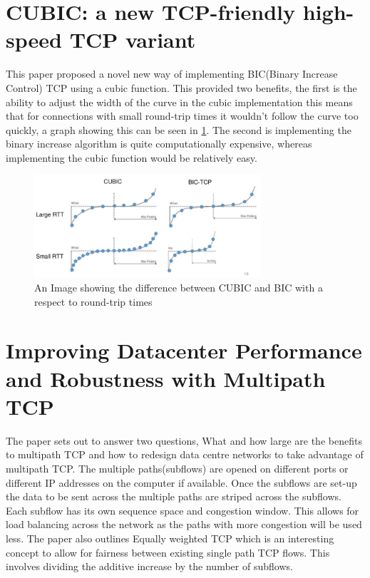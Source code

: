 \documentclass[a4paper,12pt]{scrartcl}
\begin{document}
	\section{CUBIC: a new TCP-friendly high-speed TCP variant\cite{HaRheeXuCubic}}
	{
		This paper proposed a novel new way of implementing BIC(Binary Increase Control) TCP using a cubic function. This provided two benefits, the first is the ability to adjust the width of the curve in the cubic implementation this means that for connections with small round-trip times it wouldn't follow the curve too quickly, a graph showing this can be seen in \cref{fig:BICVsCubicRTT}. The second is implementing the binary increase algorithm is quite computationally expensive, whereas implementing the cubic function would be relatively easy.
		\begin{figure}[h]
			\centering
			\includegraphics[width=0.75\textwidth]{BICVsCubicRTT}
			\caption{An Image showing the difference between CUBIC and BIC with a respect to round-trip times\cite{deawookim2015}}
			\label{fig:BICVsCubicRTT}
		\end{figure}
	}
	\section{Improving Datacenter Performance and Robustness with Multipath TCP\cite{RaiciuBarrePluntkeGreenhalghWischikHandleyMultipathTCPArticle}}
	{
		The paper sets out to answer two questions, What and how large are the benefits to multipath TCP and how to redesign data centre networks to take advantage of multipath TCP. The multiple paths(subflows) are opened on different ports or different IP addresses on the computer if available. Once the subflows are set-up the data to be sent across the multiple paths are striped across the subflows. Each subflow has its own sequence space and congestion window. This allows for load balancing across the network as the paths with more congestion will be used less. The paper also outlines Equally weighted TCP which is an interesting concept to allow for fairness between existing single path TCP flows. This involves dividing the additive increase by the number of subflows.
	}
	\newpage
	\clearpage
	\printbibliography[heading=bibintoc,title=References]
\end{document}
